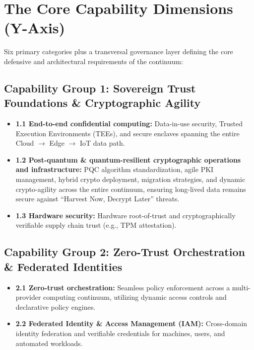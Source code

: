 \documentclass[11pt,a4paper]{article}
\begin{document}
\section{The Core Capability Dimensions (Y-Axis)}
Six primary categories plus a transversal governance layer defining the core defensive and architectural requirements of the continuum:

\subsection*{Capability Group 1: Sovereign Trust Foundations \& Cryptographic Agility}
\begin{itemize}
    \item \textbf{1.1 End-to-end confidential computing:} Data-in-use security, Trusted Execution Environments (TEEs), and secure enclaves spanning the entire Cloud $\rightarrow$ Edge $\rightarrow$ IoT data path.
    \item \textbf{1.2 Post-quantum \& quantum-resilient cryptographic operations and infrastructure:} PQC algorithm standardization, agile PKI management, hybrid crypto deployment, migration strategies, and dynamic crypto-agility across the entire continuum, ensuring long-lived data remains secure against ``Harvest Now, Decrypt Later'' threats.
    \item \textbf{1.3 Hardware security:} Hardware root-of-trust and cryptographically verifiable supply chain trust (e.g., TPM attestation).
\end{itemize}

\subsection*{Capability Group 2: Zero-Trust Orchestration \& Federated Identities}
\begin{itemize}
    \item \textbf{2.1 Zero-trust orchestration:} Seamless policy enforcement across a multi-provider computing continuum, utilizing dynamic access controls and declarative policy engines.
    \item \textbf{2.2 Federated Identity \& Access Management (IAM):} Cross-domain identity federation and verifiable credentials for machines, users, and automated workloads.
\end{itemize}
\end{document}
